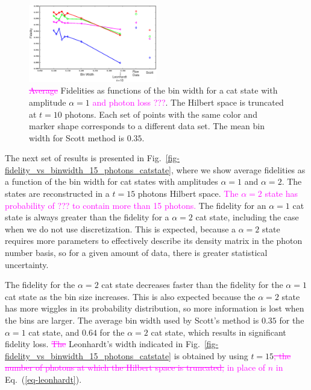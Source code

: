 \documentclass[
reprint,
superscriptaddress,
showpacs,
amsmath,
amssymb,
aps,
pra,
longbibliography
]{revtex4-1}
\providecommand{\aucmnt}[1]{#1}
\providecommand{\editcolor}[2]{\textcolor{#1}{#2}}
\providecommand{\aucmnt}[1]{}
\providecommand{\editcolor}[2]{#2}
\newcommand{\SG}[1]{\editcolor{magenta}{#1}}
\newcommand{\SGs}[1]{\aucmnt{\editcolor{magenta}{\sout{#1}}}}
\begin{document}
\begin{figure}
  \includegraphics[width=0.5\textwidth]{methods_fidelity_singledata.eps}
  \caption{\SGs{Average} Fidelities as functions of the bin width for
    a cat state with amplitude $\alpha=1$ \SG{and photon loss
      ???}. The Hilbert space is truncated at $t=10$ photons. Each set
    of points with the same color and marker shape corresponds to a
    different data set. The mean bin width for Scott method is
    $0.35$.}
  \label{fig-methods_fidelity_singledata}
\end{figure}



The next set of results is presented in
Fig.~\ref{fig-fidelity_vs_binwidth_15_photons_catstate}, where we show
average fidelities as a function of the bin width for cat states with
amplitudes $\alpha=1$ and $\alpha=2$. The states are reconstructed in
a $t=15$ photons Hilbert space. \SG{The $\alpha=2$ state has
  probability of ??? to contain more than 15 photons.} The fidelity
for an $\alpha=1$ cat state is always greater than the fidelity for a
$\alpha=2$ cat state, including the case when we do not use
discretization. This is expected, because a $\alpha = 2$ state
requires more parameters to effectively describe its density matrix in
the photon number basis, so for a given amount of data, there is
greater statistical uncertainty.

The fidelity for the $\alpha = 2$ cat state decreases faster than the
fidelity for the $\alpha=1$ cat state as the bin size increases. This
is also expected because the $\alpha = 2$ state has more wiggles in
its probability distribution, so more information is lost when the
bins are larger. The average bin width used by Scott's method is
$0.35$ for the $\alpha=1$ cat state, and $0.64$ for the $\alpha=2$ cat
state, which results in significant fidelity loss. \SGs{The}
Leonhardt's width indicated in
Fig.~\ref{fig-fidelity_vs_binwidth_15_photons_catstate} is obtained by
using $t=15$\SGs{, the number of photons at which the Hilbert space is
  truncated,} \SG{in place of $n$ in} Eq.~(\ref{eq-leonhardt}).
\end{document}
